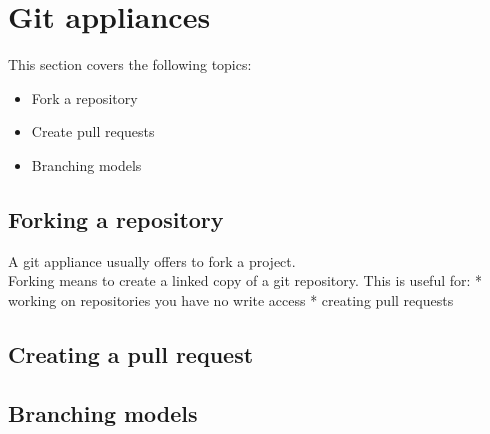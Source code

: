 \section{Git appliances}
\begin{frame}[fragile]
  \slidetitle

  This section covers the following topics:
  \begin{itemize}
    \pause
    \item Fork a repository
    \pause
    \item Create pull requests
    \pause
    \item Branching models
  \end{itemize}
\end{frame}

\subsection{Forking a repository}
\begin{frame}[fragile]
  \subslidetitle
  A git appliance usually offers to fork a project.\\
  Forking means to create a linked copy of a git repository.
  \vspace{1em}
  This is useful for:
  * working on repositories you have no write access
  * creating pull requests
\end{frame}

\subsection{Creating a pull request}
\begin{frame}[fragile]
  \subslidetitle
\end{frame}

\subsection{Branching models}
\begin{frame}[fragile]
  \subslidetitle
\end{frame}
